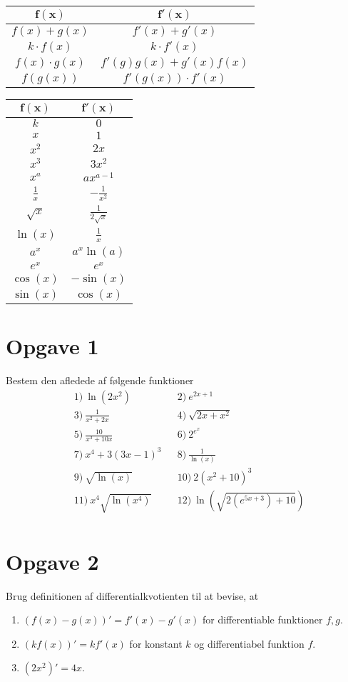 \begin{center}
	\begin{tabular}{c|c}
		$\boldsymbol{f(x)}$ & $\boldsymbol{f'(x)}$\\
		\hline
		$f(x)+g(x)$ & $f'(x) + g'(x)$\\
		\hline
		$k\cdot f(x)$ & $k\cdot f'(x)$\\
		\hline
		$f(x)\cdot g(x)$ & $f'(g)g(x) + g'(x)f(x)$\\
		\hline
		$f(g(x))$ & $f'(g(x))\cdot f'(x)$ 
	\end{tabular}
	\hspace{1.5cm}
	\begin{tabular}{c|c}
		$\boldsymbol{f(x)}$ & $\boldsymbol{f'(x)}$\\
		\hline
		$k$ & $0$\\
		\hline
		$x$ & $1$\\
		\hline 
		$x^2$ & $2x$\\
		\hline
		$x^3$ & $3x^2$\\
		\hline
		$x^a$ & $ax^{a-1}$\\
		\hline 
		$\frac{1}{x}$ & $-\frac{1}{x^2}$\\
		\hline
		$\sqrt{x}$ & $\frac{1}{2\sqrt{x}}$ \\
		\hline
		$\ln(x)$ & $\frac{1}{x}$\\
		\hline
		$a^x$ & $a^x\ln(a)$\\
		\hline 
		$e^x$ & $e^x$\\
		\hline 
		$\cos(x)$ & $-\sin(x)$\\
		\hline
		$\sin(x)$ & $\cos(x)$
	\end{tabular}
\end{center}


\section*{Opgave 1}
Bestem den afledede af følgende funktioner
\begin{align*}
&1) \  \ln(2x^2)   &&2) \  e^{2x+1}   \\
&3) \  \frac{1}{x^2+2x}  &&4) \  \sqrt{2x+x^2}   \\
&5) \  \frac{10}{x^3+10x}   &&6) \ 2^{e^x}    \\
&7) \  x^4+3(3x-1)^3   &&8) \  \frac{1}{\ln(x)}   \\
&9) \   \sqrt{\ln(x)}  &&10) \ 2(x^2+10)^3   \\
&11) \   x^4\sqrt{\ln(x^4)}  &&12) \  \ln(\sqrt{2(e^{5x+3})+10})  \\
\end{align*}
\section*{Opgave 2}
Brug definitionen af differentialkvotienten til at bevise, at
\begin{enumerate}[label=\roman*)]
\item $(f(x)-g(x))' = f'(x)-g'(x)$ for differentiable funktioner $f,g$.
\item $(kf(x))' = kf'(x)$ for konstant $k$ og differentiabel funktion $f$.
\item $(2x^2)' = 4x$. 
\end{enumerate}




